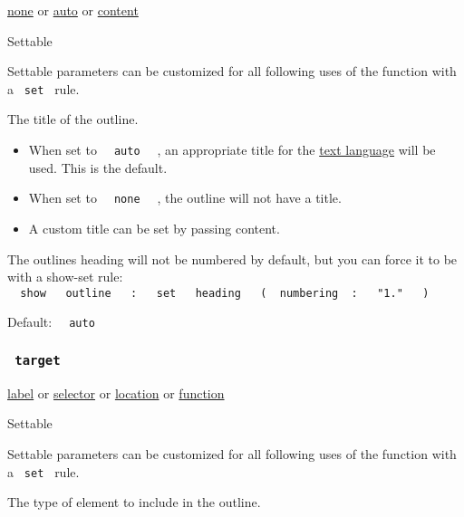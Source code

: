 \href{/docs/reference/foundations/none/}{none} {or}
\href{/docs/reference/foundations/auto/}{auto} {or}
\href{/docs/reference/foundations/content/}{content}

{{ Settable }}

\label{parameters-title-settable-tooltip}
Settable parameters can be customized for all following uses of the
function with a \texttt{\ set\ } rule.

The title of the outline.

\begin{itemize}
\tightlist
\item
  When set to \texttt{\ }{\texttt{\ auto\ }}\texttt{\ } , an appropriate
  title for the \href{/docs/reference/text/text/\#parameters-lang}{text
  language} will be used. This is the default.
\item
  When set to \texttt{\ }{\texttt{\ none\ }}\texttt{\ } , the outline
  will not have a title.
\item
  A custom title can be set by passing content.
\end{itemize}

The outline\textquotesingle s heading will not be numbered by default,
but you can force it to be with a show-set rule:
\texttt{\ }{\texttt{\ show\ }}\texttt{\ }{\texttt{\ outline\ }}\texttt{\ }{\texttt{\ :\ }}\texttt{\ }{\texttt{\ set\ }}\texttt{\ }{\texttt{\ heading\ }}\texttt{\ }{\texttt{\ (\ }}\texttt{\ numbering\ }{\texttt{\ :\ }}\texttt{\ }{\texttt{\ "1."\ }}\texttt{\ }{\texttt{\ )\ }}\texttt{\ }

Default: \texttt{\ }{\texttt{\ auto\ }}\texttt{\ }

\subsubsection{\texorpdfstring{\texttt{\ target\ }}{ target }}\label{parameters-target}

\href{/docs/reference/foundations/label/}{label} {or}
\href{/docs/reference/foundations/selector/}{selector} {or}
\href{/docs/reference/introspection/location/}{location} {or}
\href{/docs/reference/foundations/function/}{function}

{{ Settable }}

\label{parameters-target-settable-tooltip}
Settable parameters can be customized for all following uses of the
function with a \texttt{\ set\ } rule.

The type of element to include in the outline.


